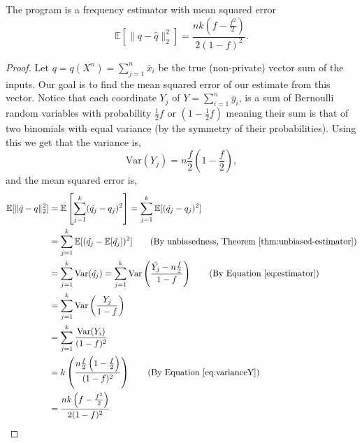 \documentclass{article}
\begin{document}
\begin{theorem}
	The program  is a frequency estimator with mean squared error
	\begin{equation*}
		\mathbb{E}[\|q-\hat{q}\|_2^2] = \frac{nk\left(f-\frac{f^2}{2}\right)}{2(1-f)^2}.
	\end{equation*}
\end{theorem}
\begin{proof}
    Let $q = q(X^n)=\sum\limits_{j=1}^n \bar{x}_i$ be the true (non-private) vector sum of the inputs. Our goal is to find the mean squared error of our estimate from this vector. Notice that each coordinate $Y_j$ of $Y=\sum_{i=1}^n \bar{y}_i$, is a sum of Bernoulli random variables with probability $\frac{1}{2}f$ or $(1-\frac{1}{2}f)$ meaning their sum is that of two binomials with equal variance (by the symmetry of their probabilities). Using this we get that the variance is,
\begin{equation}
    \text{Var}(Y_j) = n\frac{f}{2}\left(1-\frac{f}{2}\right), \label{eq:varianceY}
\end{equation}
and the mean squared error is,
\begin{align*}
    \mathbb{E}[\|\hat{q}-q\|_2^2] &= \mathbb{E}\left[\sum\limits_{j=1}^k(\hat{q_j}-q_j)^2\right] = \sum\limits_{j=1}^k\mathbb{E}[(\hat{q_j}-q_j)^2] \\
			&= \sum\limits_{j=1}^k\mathbb{E}[(\hat{q_j}-\mathbb{E}[\hat{q_j}])^2] \tag{By unbiasedness, Theorem~\ref{thm:unbiased-estimator}}\\
			&= \sum\limits_{j=1}^k\text{Var}(\hat{q_j}) = \sum\limits_{j=1}^k\text{Var}\left(\frac{\hat{Y_j}-n\frac{f}{2}}{1-f}\right) \tag{By Equation~\ref{eq:estimator}}\\
			&= \sum\limits_{j=1}^k\text{Var}\left(\frac{Y_j}{1-f}\right) \\
			&= \sum\limits_{j=1}^k\frac{\text{Var}(Y_i)}{(1-f)^2}\\
			&= k\left(\frac{n\frac{f}{2}\left(1-\frac{f}{2}\right)}{(1-f)^2}\right) \tag{By Equation~\ref{eq:varianceY}}\\
			& = \frac{nk\left(f-\frac{f^2}{2}\right)}{2(1-f)^2}
\end{align*}
\end{proof}



\end{document}
